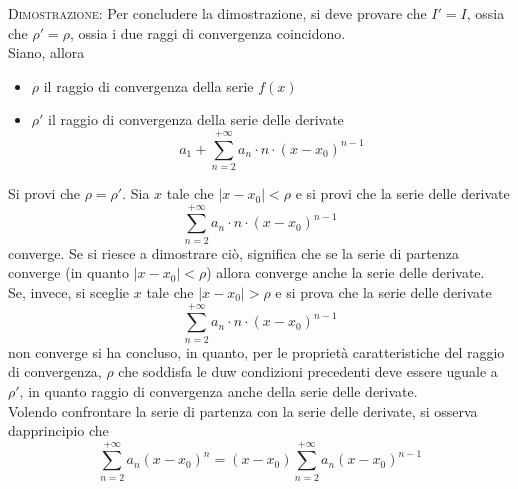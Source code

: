 \documentclass[a4paper]{extarticle}
\begin{document}
\vspace{2em}
\noindent
\normalfont \normalsize
\textsc{Dimostrazione}: Per concludere la dimostrazione, si deve provare che $I'=I$, ossia che $\rho'=\rho$, ossia i due raggi di convergenza coincidono.\\
Siano, allora
\begin{itemize}
    \item $\rho$ il raggio di convergenza della serie $f(x)$
    \item $\rho'$ il raggio di convergenza della serie delle derivate
    \[a_1 + \sum_{n=2}^{+\infty} a_n \cdot n \cdot (x-x_0)^{n-1}\]
\end{itemize}
Si provi che $\rho=\rho'$. Sia $x$ tale che $\left \vert x - x_0 \right \vert < \rho$ e si provi che la serie delle derivate
\[\sum_{n=2}^{+\infty} a_n \cdot n \cdot (x-x_0)^{n-1}\]
converge. Se si riesce a dimostrare ciò, significa che se la serie di partenza converge (in quanto $\left \vert x - x_0 \right \vert < \rho$) allora converge anche la serie delle derivate.\\
Se, invece, si sceglie $x$ tale che $\left \vert x - x_0 \right \vert > \rho$ e si prova che la serie delle derivate
\[\sum_{n=2}^{+\infty} a_n \cdot n \cdot (x-x_0)^{n-1}\]
non converge si ha concluso, in quanto, per le proprietà caratteristiche del raggio di convergenza, $\rho$ che soddisfa le duw condizioni precedenti deve essere uguale a $\rho'$, in quanto raggio di convergenza anche della serie delle derivate.\\
Volendo confrontare la serie di partenza con la serie delle derivate, si osserva dapprincipio che
\[\sum_{n=2}^{+\infty} a_n (x-x_0)^n = (x-x_0) \sum_{n=2}^{+\infty} a_n (x-x_0)^{n-1}\]
\end{document}
